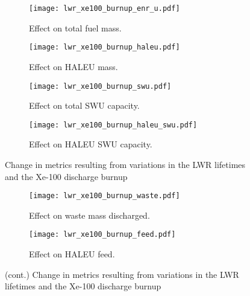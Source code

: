 \begin{figure}
    \begin{subfigure}[h!]{0.48\textwidth}
        \centering
        \texttt{[image: lwr\_xe100\_burnup\_enr\_u.pdf]}
        \caption{Effect on total fuel mass.}
        \label{fig:lwr_xe100_burnup_enr_u}
    \end{subfigure}
    \hfill
    \begin{subfigure}[h!]{0.48\textwidth}
        \centering
        \texttt{[image: lwr\_xe100\_burnup\_haleu.pdf]}
        \caption{Effect on HALEU mass.}
        \label{fig:lwr_xe100_burnup_haleu}
    \end{subfigure}
    
    \begin{subfigure}[h!]{0.48\textwidth}
        \centering
        \texttt{[image: lwr\_xe100\_burnup\_swu.pdf]}
        \caption{Effect on total SWU capacity.}
        \label{fig:lwr_xe100_burnup_swu}
    \end{subfigure}
    \hfill
    \begin{subfigure}[h!]{0.48\textwidth}
        \centering
        \texttt{[image: lwr\_xe100\_burnup\_haleu\_swu.pdf]}
        \caption{Effect on HALEU SWU capacity.}
        \label{fig:lwr_xe100_burnup_haleu_swu}
    \end{subfigure}
    \caption{Change in metrics resulting from variations in the 
    LWR lifetimes and the Xe-100 discharge burnup}
\end{figure}

\begin{figure}
    \ContinuedFloat    
    \begin{subfigure}[h!]{0.48\textwidth}
        \centering
        \texttt{[image: lwr\_xe100\_burnup\_waste.pdf]}
        \caption{Effect on waste mass discharged.}
        \label{fig:lwr_xe100_burnup_waste}
    \end{subfigure}
    \hfill
    \begin{subfigure}[h!]{0.48\textwidth}
        \centering
        \texttt{[image: lwr\_xe100\_burnup\_feed.pdf]}
        \caption{Effect on HALEU feed.}
        \label{fig:lwr_xe100_burnup_feed}
    \end{subfigure}
    \caption{(cont.) Change in metrics resulting from variations in the 
    LWR lifetimes and the Xe-100 discharge burnup}
    \label{fig:lwr_xe100_burnup}
\end{figure}

